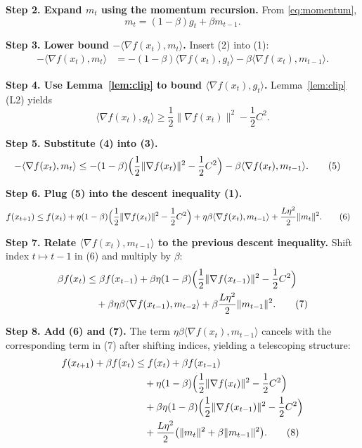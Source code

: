 \documentclass{article}
\begin{document}
\noindent\textbf{Step 2. Expand $m_t$ using the momentum recursion.}  
From \eqref{eq:momentum},
\[
    m_t = (1-\beta)g_t + \beta m_{t-1}.
\tag{2}
\]

\noindent\textbf{Step 3. Lower bound $-\langle\nabla f(x_t),m_t\rangle$.}  
Insert (2) into (1):
\[
\begin{aligned}
    -\langle\nabla f(x_t),m_t\rangle
    &= -(1-\beta)\langle\nabla f(x_t),g_t\rangle
       -\beta\langle\nabla f(x_t),m_{t-1}\rangle .
\tag{3}
\end{aligned}
\]

\noindent\textbf{Step 4. Use Lemma~\ref{lem:clip} to bound $\langle\nabla f(x_t),g_t\rangle$.}  
Lemma~\ref{lem:clip} (L2) yields
\[
    \langle\nabla f(x_t),g_t\rangle
    \ge \frac12\|\nabla f(x_t)\|^{2}-\frac12 C^{2}.
\tag{4}
\]

\noindent\textbf{Step 5. Substitute (4) into (3).}
\[
\begin{aligned}
    -\langle\nabla f(x_t),m_t\rangle
    &\le -(1-\beta)\Bigl(\frac12\|\nabla f(x_t)\|^{2}
                         -\frac12 C^{2}\Bigr)
       -\beta\langle\nabla f(x_t),m_{t-1}\rangle .
\tag{5}
\end{aligned}
\]

\noindent\textbf{Step 6. Plug (5) into the descent inequality (1).}
\[
\begin{aligned}
    f(x_{t+1})
    &\le f(x_t)
       +\eta(1-\beta)\Bigl(\frac12\|\nabla f(x_t)\|^{2}
                         -\frac12 C^{2}\Bigr)
       +\eta\beta\langle\nabla f(x_t),m_{t-1}\rangle
       +\frac{L\eta^{2}}{2}\|m_t\|^{2}.
\tag{6}
\end{aligned}
\]

\noindent\textbf{Step 7. Relate $\langle\nabla f(x_t),m_{t-1}\rangle$ to the
previous descent inequality.}  
Shift index $t\mapsto t-1$ in (6) and multiply by $\beta$:
\[
\begin{aligned}
    \beta f(x_t)
    &\le \beta f(x_{t-1})
       +\beta\eta(1-\beta)\Bigl(\frac12\|\nabla f(x_{t-1})\|^{2}
                         -\frac12 C^{2}\Bigr)  \\
    &\quad
       +\beta\eta\beta\langle\nabla f(x_{t-1}),m_{t-2}\rangle
       +\beta\frac{L\eta^{2}}{2}\|m_{t-1}\|^{2}.
\tag{7}
\end{aligned}
\]

\noindent\textbf{Step 8. Add (6) and (7).}  
The term $\eta\beta\langle\nabla f(x_t),m_{t-1}\rangle$ cancels with the
corresponding term in (7) after shifting indices, yielding a telescoping
structure:
\[
\begin{aligned}
    f(x_{t+1})+\beta f(x_t)
    &\le f(x_t)+\beta f(x_{t-1}) \\
    &\quad
       +\eta(1-\beta)\Bigl(\frac12\|\nabla f(x_t)\|^{2}
                         -\frac12 C^{2}\Bigr)\\
    &\quad
       +\beta\eta(1-\beta)\Bigl(\frac12\|\nabla f(x_{t-1})\|^{2}
                         -\frac12 C^{2}\Bigr)\\
    &\quad
       +\frac{L\eta^{2}}{2}\bigl(\|m_t\|^{2}+\beta\|m_{t-1}\|^{2}\bigr).
\tag{8}
\end{aligned}
\]
\end{document}
